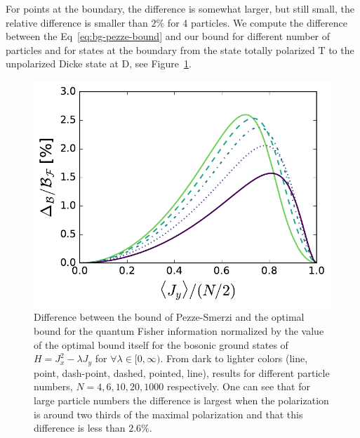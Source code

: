 For points at the boundary, the difference is somewhat larger, but still small, the relative difference is smaller than $2\%$ for 4 particles.
We compute the difference between the Eq~\eqref{eq:bg-pezze-bound} and our bound for different number of particles and for states at the boundary from the state totally polarized T to the unpolarized Dicke state at D, see Figure~\ref{fig:lt-edge-diff}.
\begin{figure}[htp]
  \centering
  \includegraphics[scale=.65]{img/LT_edge_diff.pdf}
  \caption[Boundary difference of optimal bound versus Pezz\'e-Smerzi bound.]{Difference between the bound of Pezze-Smerzi and the optimal bound for the quantum Fisher information normalized by the value of the optimal bound itself for the bosonic ground states of $H=J_x^2-\lambda J_y$ for $\forall \lambda \in [0,\infty)$.
  From dark to lighter colors (line, point, dash-point, dashed, pointed, line), results for different particle numbers, $N=4,6,10,20,1000$ respectively.
  One can see that for large particle numbers the difference is largest when the polarization is around two thirds of the maximal polarization and that this difference is less than $2.6\%$.}
  \label{fig:lt-edge-diff}
\end{figure}

